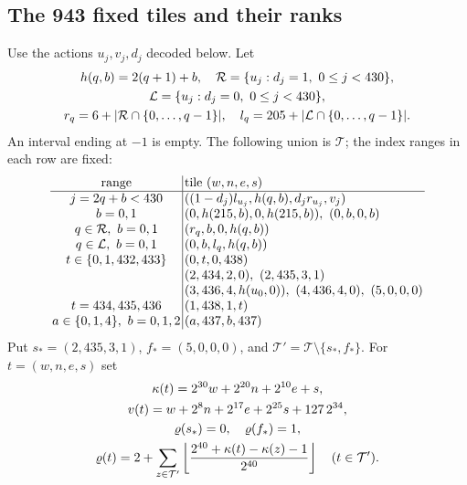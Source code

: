\subsection*{The 943 fixed tiles and their ranks}
Use the actions $u_j,v_j,d_j$ decoded below. Let
\[
\begin{gathered}
h(q,b)=2(q+1)+b,\quad
\mathcal R=\{u_j:d_j=1,\ 0\le j<430\},\\
\mathcal L=\{u_j:d_j=0,\ 0\le j<430\},\\
r_q=6+|\mathcal R\cap\{0,\ldots,q-1\}|,\quad
l_q=205+|\mathcal L\cap\{0,\ldots,q-1\}|.
\end{gathered}
\]
An interval ending at $-1$ is empty. The following union is $\mathcal T$;
the index ranges in each row are fixed:
\[
\setlength{\arraycolsep}{1.4pt}\begin{array}{c|l}
\text{range}&\text{tile }(w,n,e,s)\\\hline
j=2q+b<430&((1-d_j)l_{u_j},h(q,b),d_jr_{u_j},v_j)\\
b=0,1&(0,h(215,b),0,h(215,b)),\ (0,b,0,b)\\
q\in\mathcal R,\ b=0,1&(r_q,b,0,h(q,b))\\
q\in\mathcal L,\ b=0,1&(0,b,l_q,h(q,b))\\
t\in\{0,1,432,433\}&(0,t,0,438)\\
&(2,434,2,0),\ (2,435,3,1)\\
&(3,436,4,h(u_0,0)),\ (4,436,4,0),\ (5,0,0,0)\\
t=434,435,436&(1,438,1,t)\\
a\in\{0,1,4\},\ b=0,1,2&(a,437,b,437)
\end{array}
\]
Put $s_*=(2,435,3,1)$, $f_*=(5,0,0,0)$, and $\mathcal T'=\mathcal T\setminus\{s_*,f_*\}$.
For $t=(w,n,e,s)$ set
\[
\begin{gathered}
\kappa(t)=2^{30}w+2^{20}n+2^{10}e+s,\\
v(t)=w+2^8n+2^{17}e+2^{25}s+127\,2^{34},\\
\varrho(s_*)=0,\quad\varrho(f_*)=1,\\
\varrho(t)=2+\sum_{z\in\mathcal T'}
 \left\lfloor\frac{2^{40}+\kappa(t)-\kappa(z)-1}{2^{40}}\right\rfloor
 \quad(t\in\mathcal T').
\end{gathered}
\]

